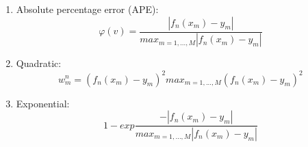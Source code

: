 \documentclass[runningheads,a4paper]{llncs}[2015/06/24]
\begin{document}
\begin{enumerate}
\item Absolute percentage error (APE):
\begin{equation}
φ(v) = \frac{|f_n(x_m)-y_m|}{max_{m=1,...,M} |f_n(x_m)-y_m|}
\end{equation}
\item Quadratic:
\begin{equation}
w^n_m = (f_n(x_m)-y_m)^2 max_{m=1,...,M} (f_n(x_m)-y_m)^2
\end{equation}
\item Exponential:
\begin{equation}
1 - exp\frac{-|f_n(x_m)-y_m|}{max_{m=1,...,M} |f_n(x_m)-y_m|}
\end{equation}
\end{enumerate}
\end{document}
